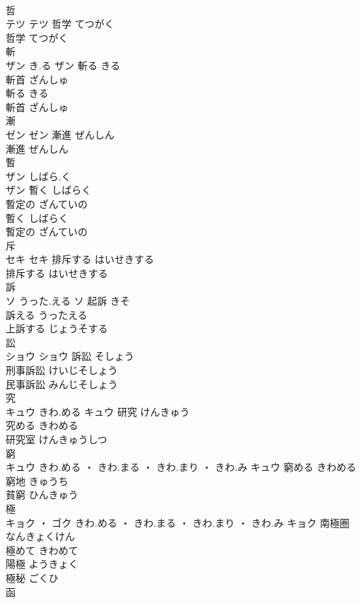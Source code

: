 \documentclass[8pt]{extreport}
\begin{document}
\begin{CJK}{UTF8}{min}
\\	哲	
\\	テツ		テツ	哲学	てつがく	
\\	哲学	てつがく	
\\	斬	
\\	ザン	き.る	ザン	斬る	きる	
\\	斬首	ざんしゅ	
\\	斬る	きる	
\\	斬首	ざんしゅ	
\\	漸	
\\	ゼン		ゼン	漸進	ぜんしん	
\\	漸進	ぜんしん	
\\	暫	
\\	ザン	しばら.く
\\	ザン	暫く	しばらく	
\\	暫定の	ざんていの	
\\	暫く	しばらく	
\\	暫定の	ざんていの	
\\	斥	
\\	セキ		セキ	排斥する	はいせきする	
\\	排斥する	はいせきする	
\\	訴	
\\	ソ	うった.える	ソ	起訴	きそ	
\\	訴える	うったえる	
\\	上訴する	じょうそする	
\\	訟	
\\	ショウ		ショウ	訴訟	そしょう	
\\	刑事訴訟	けいじそしょう	
\\	民事訴訟	みんじそしょう	
\\	究	
\\	キュウ	きわ.める	キュウ	研究	けんきゅう	
\\	究める	きわめる	
\\	研究室	けんきゅうしつ	
\\	窮	
\\	キュウ	きわ.める ・ きわ.まる ・ きわ.まり ・ きわ.み	キュウ	窮める	きわめる	
\\	窮地	きゅうち	
\\	貧窮	ひんきゅう	
\\	極	
\\	キョク ・ ゴク	きわ.める ・ きわ.まる ・ きわ.まり ・ きわ.み	キョク	南極圏	なんきょくけん	
\\	極めて	きわめて	
\\	陽極	ようきょく	
\\	極秘	ごくひ	
\\	函	

\end{CJK}
\end{document}
